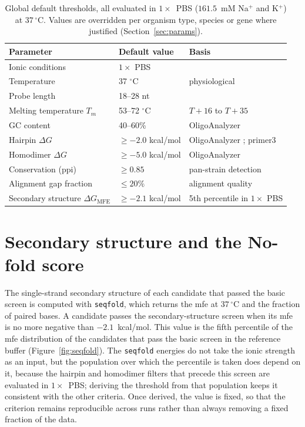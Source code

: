 \begin{table}[H]
\begin{center}
\begin{tabular}{@{}l l p{6.1cm}@{}}
\hline
\textbf{Parameter} & \textbf{Default value} & \textbf{Basis} \\
\hline
Ionic conditions        & $1\times$ PBS          & \citep{purwidyantri2021,cshpbs2006} \\
Temperature             & 37 $^{\circ}$C         & physiological \\
Probe length            & 18--28 nt              & \citep{wetmur1991} \\
Melting temperature $T_m$ & 53--72 $^{\circ}$C   & $T+16$ to $T+35$ \citep{santalucia2004} \\
GC content              & 40--60\%               & OligoAnalyzer \citep{idtoligo} \\
Hairpin $\Delta G$      & $\geq -2.0$ kcal/mol   & OligoAnalyzer \citep{idtoligo}; primer3 \citep{untergasser2012} \\
Homodimer $\Delta G$    & $\geq -5.0$ kcal/mol   & OligoAnalyzer \citep{idtoligo} \\
Conservation (\acrshort{ppi}) & $\geq 0.85$      & pan-strain detection \citep{viruscope} \\
Alignment gap fraction  & $\leq 20\%$            & alignment quality \\
Secondary structure $\Delta G_{\text{MFE}}$ & $\geq -2.1$ kcal/mol & 5th percentile in $1\times$ PBS \\
\hline
\end{tabular}
\end{center}
\caption[Global default thresholds]{Global default thresholds, all evaluated in $1\times$~PBS ($161.5$~mM Na$^+$ and K$^+$) at
$37\,^{\circ}$C. Values are overridden per organism type, species or gene where justified
(Section~\ref{sec:params}).}
\label{tab:params}
\end{table}

\section{Secondary structure and the No-fold score}

The single-strand secondary structure of each candidate that passed the basic screen is computed with
\texttt{seqfold}, which returns the \acrshort{mfe} at $37\,^{\circ}$C and the fraction of paired bases. A
candidate passes the secondary-structure screen when its \acrshort{mfe} is no more negative than
$-2.1$~kcal/mol. This value is the fifth percentile of the \acrshort{mfe} distribution of the candidates
that pass the basic screen in the reference buffer (Figure~\ref{fig:seqfold}). The \texttt{seqfold}
energies do not take the ionic strength as an input, but the population over which the percentile is
taken does depend on it, because the hairpin and homodimer filters that precede this screen are
evaluated in $1\times$~PBS; deriving the threshold from that population keeps it consistent with the
other criteria. Once derived, the value is fixed, so that the criterion remains reproducible across runs
rather than always removing a fixed fraction of the data.

